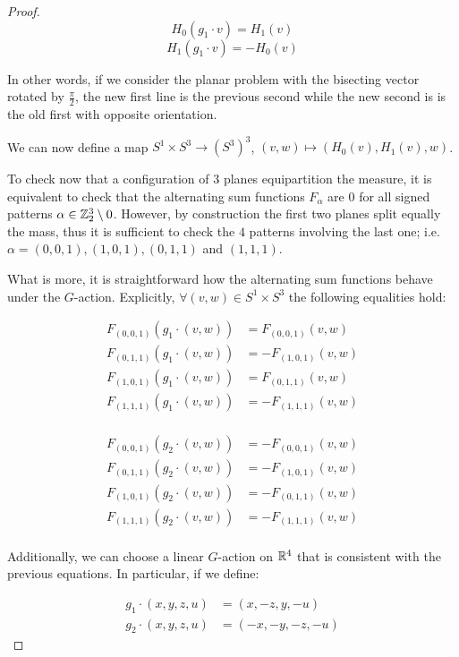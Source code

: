 \documentclass[10pt]{article}
\begin{document}
\begin{proof}
  \[
    H_0(g_1\cdot v) = H_1(v)
  \]
  \[
    H_1(g_1\cdot v) = -H_0(v)
  \]

  In other words, if we consider the planar problem with the bisecting vector rotated by $\frac{\pi}{2}$, the new first line is the previous second while the new second is
  is the old first with opposite orientation.

  We can now define a map $S^1\times S^3 \rightarrow (S^3)^3$, $(v, w) \mapsto (H_0(v), H_1(v), w)$.

  To check now that a configuration of $3$ planes equipartition the measure, it is equivalent to check that the alternating sum functions $F_\alpha$ are $0$ for all signed
  patterns $\alpha\in \mathbb{Z}_2^3 \setminus 0$. However, by construction the first two planes split equally the mass, thus it is sufficient to check the $4$
  patterns involving the last one; i.e. $\alpha = (0,0,1), (1,0,1), (0,1,1)$ and $(1,1,1)$.

  What is more, it is straightforward  how the alternating sum functions behave under the $G$-action.
  Explicitly, $\forall (v,w)\in S^1\times S^3$ the following equalities hold:

  \begin{align*}
    F_{(0,0,1)}(g_1\cdot (v,w)) &=  F_{(0,0,1)}(v,w)\\
    F_{(0,1,1)}(g_1\cdot (v,w)) &=   - F_{(1,0,1)}(v,w)\\
    F_{(1,0,1)}(g_1\cdot (v,w)) &=  F_{(0,1,1)}(v,w)\\
    F_{(1,1,1)}(g_1\cdot (v,w)) &=  - F_{(1,1,1)}(v,w)\\
  \end{align*}

  \begin{align*}
    F_{(0,0,1)}(g_2\cdot (v,w)) &=  - F_{(0,0,1)}(v,w)\\
    F_{(0,1,1)}(g_2\cdot (v,w)) &=  - F_{(1,0,1)}(v,w)\\
    F_{(1,0,1)}(g_2\cdot (v,w)) &=  - F_{(0,1,1)}(v,w)\\
    F_{(1,1,1)}(g_2\cdot (v,w)) &=  - F_{(1,1,1)}(v,w)\\
  \end{align*}

  Additionally, we can choose a linear $G$-action on $\mathbb{R}^4$ that is consistent with the previous equations. In particular, if we define:

  \begin{align*}
    g_1\cdot (x, y, z, u) &= (x, -z, y, -u)\\
    g_2 \cdot (x, y, z, u) &= (-x, -y, -z, -u)
  \end{align*}


\end{proof}
\end{document}
